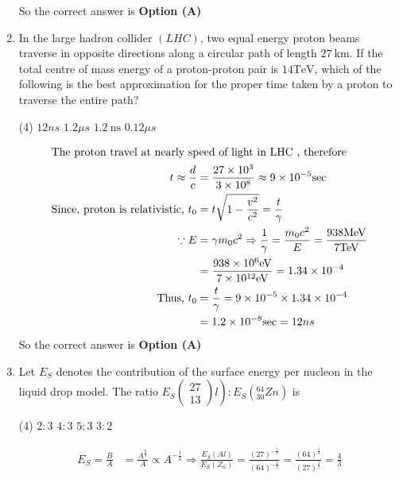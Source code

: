 \begin{enumerate}
\begin{answer}
So the correct answer is \textbf{Option (A)}
\end{answer}
	\item In the large hadron collider $(L H C)$, two equal energy proton beams traverse in opposite directions along a circular path of length $27 \mathrm{~km}$. If the total centre of mass energy of a proton-proton pair is $14 \mathrm{TeV}$, which of the following is the best approximation for the proper time taken by a proton to traverse the entire path?
{	}
\begin{tasks}(4)
\task[\textbf{A.}] $12 n s$
\task[\textbf{B.}] $1.2 \mu s$
\task[\textbf{C.}] $1.2 \mathrm{~ns}$
\task[\textbf{D.}] $0.12 \mu s$
\end{tasks}
\begin{answer}
\begin{align*}
\intertext{The proton travel at nearly speed of light in LHC , therefore}
t \approx \frac{d}{c}&=\frac{27 \times 10^{3}}{3 \times 10^{8}} \approx 9 \times 10^{-5} \mathrm{sec}\\
\text{Since, proton is relativistic, }t_{0}&=t \sqrt{1-\frac{v^{2}}{c^{2}}}=\frac{t}{\gamma}\\
\because E&=\gamma m_{0} c^{2} \Rightarrow \frac{1}{\gamma}=\frac{m_{0} c^{2}}{E}=\frac{938 \mathrm{MeV}}{7 \mathrm{TeV}}\\&=\frac{938 \times 10^{6} \mathrm{eV}}{7 \times 10^{12} \mathrm{eV}}=1.34 \times 10^{-4}\\
\text{Thus, }t_{0}&=\frac{t}{\gamma}=9 \times 10^{-5} \times 1.34 \times 10^{-4}\\&=1.2 \times 10^{-8} \mathrm{sec}=12 ns
\end{align*}
So the correct answer is \textbf{Option (A)}
\end{answer}
\item Let $E_{S}$ denotes the contribution of the surface energy per nucleon in the liquid drop model. The ratio $\left.E_{S}\left(\begin{array}{l}27 \\ 13\end{array}\right) l\right): E_{S}\left({ }_{30}^{64} Z n\right)$ is
{}
\begin{tasks}(4)
\task[\textbf{A.}]  $2: 3$
\task[\textbf{B.}] $4: 3$
\task[\textbf{C.}] $5: 3$
\task[\textbf{D.}] $3: 2$
\end{tasks}
\begin{answer}
\begin{align*}
E_{S}=\frac{B}{A}&=\frac{A^{\frac{2}{3}}}{A} \propto A^{-\frac{1}{3}} \Rightarrow \frac{E_{S}(A l)}{E_{S}\left(Z_{n}\right)}=\frac{(27)^{-\frac{1}{3}}}{(64)^{-\frac{1}{3}}}=\frac{(64)^{\frac{1}{3}}}{(27)^{\frac{1}{3}}}=\frac{4}{3}

\end{align*}
\end{answer}
\end{enumerate}
